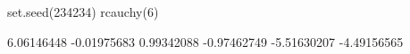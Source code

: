 \begin{Schunk}
\begin{Sinput}
  set.seed(234234)
  rcauchy(6)
\end{Sinput}
\begin{Soutput}
[1]  6.06146448 -0.01975683  0.99342088 -0.97462749 -5.51630207 -4.49156565
\end{Soutput}
\end{Schunk}

